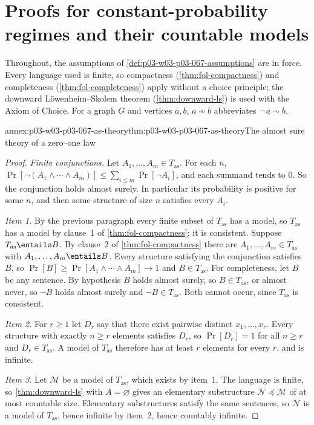 \section{Proofs for constant-probability regimes and their countable models}
\label{sec:annex-p03-w03-p03-067-constant-p}

Throughout, the assumptions of \cref{def:p03-w03-p03-067-assumptions} are in
force.  Every language used is finite, so compactness
(\cref{thm:fol-compactness}) and completeness (\cref{thm:fol-completeness})
apply without a choice principle; the downward L\"owenheim--Skolem theorem
(\cref{thm:downward-ls}) is used with the Axiom of Choice.  For a graph
\(G\) and vertices \(a,b\), \(a\not\sim b\) abbreviates \(\neg\,a\sim b\).

\begin{annexitem}{annex:p03-w03-p03-067-as-theory}{thm:p03-w03-p03-067-as-theory}{The almost sure theory of a zero--one law}
\begin{proof}
\emph{Finite conjunctions.}  Let \(A_1,\ldots,A_m\in T_{\mathrm{as}}\).  For
each \(n\),
\(\Pr[\neg(A_1\land\cdots\land A_m)]\leq\sum_{i\leq m}\Pr[\neg A_i]\), and each
summand tends to \(0\).  So the conjunction holds almost surely.  In
particular its probability is positive for some \(n\), and then some
structure of size \(n\) satisfies every \(A_i\).

\emph{Item 1.}  By the previous paragraph every finite subset of
\(T_{\mathrm{as}}\) has a model, so \(T_{\mathrm{as}}\) has a model by clause~1
of \cref{thm:fol-compactness}; it is consistent.  Suppose
\(T_{\mathrm{as}}\entails B\).  By clause~2 of \cref{thm:fol-compactness}
there are \(A_1,\ldots,A_m\in T_{\mathrm{as}}\) with
\(A_1,\ldots,A_m\entails B\).  Every structure satisfying the conjunction
satisfies \(B\), so \(\Pr[B]\geq\Pr[A_1\land\cdots\land A_m]\to1\) and
\(B\in T_{\mathrm{as}}\).  For completeness, let \(B\) be any sentence.  By
hypothesis \(B\) holds almost surely, so \(B\in T_{\mathrm{as}}\), or almost
never, so \(\neg B\) holds almost surely and \(\neg B\in T_{\mathrm{as}}\).
Both cannot occur, since \(T_{\mathrm{as}}\) is consistent.

\emph{Item 2.}  For \(r\geq1\) let \(D_r\) say that there exist pairwise
distinct \(x_1,\ldots,x_r\).  Every structure with exactly \(n\geq r\)
elements satisfies \(D_r\), so \(\Pr[D_r]=1\) for all \(n\geq r\) and
\(D_r\in T_{\mathrm{as}}\).  A model of \(T_{\mathrm{as}}\) therefore has at
least \(r\) elements for every \(r\), and is infinite.

\emph{Item 3.}  Let \(\mathcal M\) be a model of \(T_{\mathrm{as}}\), which
exists by item~1.  The language is finite, so \cref{thm:downward-ls} with
\(A=\varnothing\) gives an elementary substructure
\(\mathcal N\preccurlyeq\mathcal M\) of at most countable size.  Elementary
substructures satisfy the same sentences, so \(\mathcal N\) is a model of
\(T_{\mathrm{as}}\), hence infinite by item~2, hence countably infinite.
\end{proof}
\end{annexitem}


